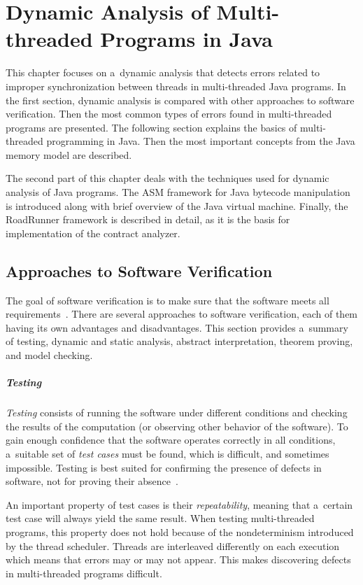 \chapter{Dynamic Analysis of Multi-threaded Programs in Java}
\label{chTwo}

This chapter focuses on a~dynamic analysis that detects errors related to
improper synchronization between threads in multi-threaded Java programs. In the
first section, dynamic analysis is compared with other approaches to software
verification. Then the most common types of errors found in multi-threaded
programs are presented. The following section explains the basics of
multi-threaded programming in Java. Then the most important concepts from the
Java memory model are described.

The second part of this chapter deals with the techniques used for dynamic
analysis of Java programs. The ASM framework for Java bytecode manipulation is
introduced along with brief overview of the Java virtual machine. Finally, the
RoadRunner framework is described in detail, as it is the basis for
implementation of the contract analyzer.


\section{Approaches to Software Verification}
\label{approachesToSwVerification}

The goal of software verification is to make sure that the software meets all
requirements~\cite{fundamentals}. There are several approaches to software
verification, each of them having its own advantages and disadvantages. This
section provides a~summary of testing, dynamic and static analysis, abstract
interpretation, theorem proving, and model checking.

\paragraph{Testing}
\emph{Testing} consists of running the software under different conditions and
checking the results of the computation (or observing other behavior of the
software). To gain enough confidence that the software operates correctly in all
conditions, a~suitable set of \emph{test cases} must be found, which is
difficult, and sometimes impossible. Testing is best suited for confirming
the presence of defects in software, not for proving their
absence~\cite{fundamentals}.

An important property of test cases is their \emph{repeatability}, meaning that
a~certain test case will always yield the same result. When testing
multi-threaded programs, this property does not hold because of the
nondeterminism introduced by the thread scheduler. Threads are interleaved
differently on each execution which means that errors may or may not appear.
This makes discovering defects in multi-threaded programs difficult.

